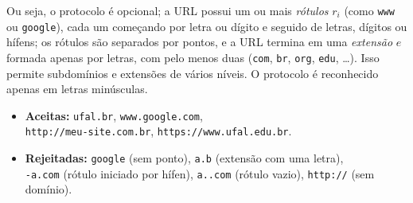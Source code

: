 \documentclass[12pt]{article}
\begin{document}
Ou seja, o protocolo é opcional; a URL possui um ou mais \emph{rótulos}
$r_i$ (como \texttt{www} ou \texttt{google}), cada um começando por letra ou
dígito e seguido de letras, dígitos ou hífens; os rótulos são separados por
pontos, e a URL termina em uma \emph{extensão} $e$ formada apenas por letras,
com pelo menos duas (\texttt{com}, \texttt{br}, \texttt{org}, \texttt{edu}, \dots).
Isso permite subdomínios e extensões de vários níveis. O protocolo é
reconhecido apenas em letras minúsculas.

\medskip
\begin{itemize}
  \item \textbf{Aceitas:} \texttt{ufal.br}, \texttt{www.google.com},\\
        \texttt{http://meu-site.com.br}, \texttt{https://www.ufal.edu.br}.
  \item \textbf{Rejeitadas:} \texttt{google} (sem ponto), \texttt{a.b}
        (extensão com uma letra),\\
        \texttt{-a.com} (rótulo iniciado por hífen), \texttt{a..com} (rótulo vazio), \texttt{http://} (sem domínio).
\end{itemize}
\end{document}
